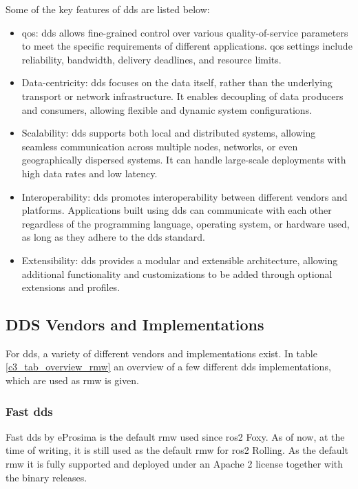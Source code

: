 Some of the key features of \gls{dds} are listed below:
\begin{itemize}
    \item \gls{qos}: \gls{dds} allows fine-grained control over various quality-of-service parameters to meet the specific requirements of different applications. \gls{qos} settings include reliability, bandwidth, delivery deadlines, and resource limits.

    \item Data-centricity: \gls{dds} focuses on the data itself, rather than the underlying transport or network infrastructure. It enables decoupling of data producers and consumers, allowing flexible and dynamic system configurations.

    \item Scalability: \gls{dds} supports both local and distributed systems, allowing seamless communication across multiple nodes, networks, or even geographically dispersed systems. It can handle large-scale deployments with high data rates and low latency.

    \item Interoperability: \gls{dds} promotes interoperability between different vendors and platforms. Applications built using \gls{dds} can communicate with each other regardless of the programming language, operating system, or hardware used, as long as they adhere to the \gls{dds} standard.

    \item Extensibility: \gls{dds} provides a modular and extensible architecture, allowing additional functionality and customizations to be added through optional extensions and profiles.

\end{itemize}
\subsection{DDS Vendors and Implementations}
For \gls{dds}, a variety of different vendors and implementations exist. In table \ref{c3_tab_overview_rmw} an overview of a few different \gls{dds} implementations, which are used as \gls{rmw} is given.
\subsubsection*{Fast \gls{dds}}
Fast \gls{dds} by eProsima is the default \gls{rmw} used since \gls{ros2} Foxy. As of now, at the time of writing, it is still used as the default \gls{rmw} for \gls{ros2} Rolling. As the default \gls{rmw} it is fully supported and deployed under an Apache 2 license together with the binary releases. \cite{noauthor_dds_nodate-1} 
